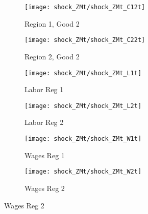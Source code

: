 \documentclass[../thesis.tex]{subfiles}
\begin{document}
\begin{figure}[h!]
	\centering
	
	
	\begin{subfigure}[b]{0.3\textwidth}
		\centering
		\texttt{[image: shock\_ZMt/shock\_ZMt\_C12t]}
		\caption{\footnotesize Region 1, Good 2}
		\label{fig:ZMt-C12t}
	\end{subfigure}
	\hfill
	\begin{subfigure}[b]{0.3\textwidth}
		\centering
		\texttt{[image: shock\_ZMt/shock\_ZMt\_C22t]}
		\caption{\footnotesize Region 2, Good 2}
		\label{fig:ZMt-C22t}
	\end{subfigure}
	\hfill
	\begin{subfigure}[b]{0.3\textwidth}
		\centering
		\texttt{[image: shock\_ZMt/shock\_ZMt\_L1t]}
		\caption{\footnotesize Labor Reg 1}
		\label{fig:ZMt-L1t}
	\end{subfigure}
	\hfill		
	\vspace*{0.5cm}
	
	
	\begin{subfigure}[b]{0.3\textwidth}
		\centering
		\texttt{[image: shock\_ZMt/shock\_ZMt\_L2t]}
		\caption{\footnotesize Labor Reg 2}
		\label{fig:ZMt-L2t}
	\end{subfigure}
	\hfill
	\begin{subfigure}[b]{0.3\textwidth}
		\centering
		\texttt{[image: shock\_ZMt/shock\_ZMt\_W1t]}
		\caption{\footnotesize Wages Reg 1}
		\label{fig:ZMt-W1t}
	\end{subfigure}
	\hfill
	\begin{subfigure}[b]{0.3\textwidth}
		\centering
		\texttt{[image: shock\_ZMt/shock\_ZMt\_W2t]}
		\caption{\footnotesize Wages Reg 2}
		\label{fig:ZMt-W2t}
	\end{subfigure}
	\hfill
	\vspace*{0.5cm}
	
	

\end{figure}
\end{document}
